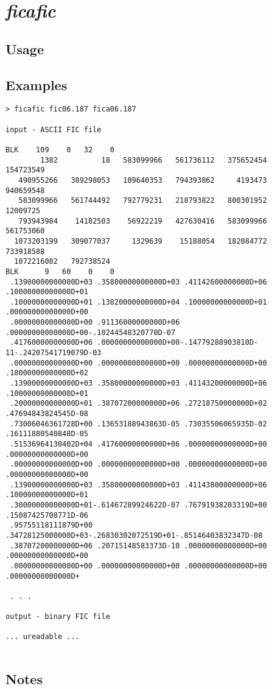 \section{\emph{ficafic}}
\subsection{Usage}
\subsection{Examples}

\begin{small}
\begin{Verbatim}
> ficafic fic06.187 fica06.187

input - ASCII FIC file

BLK    109    0   32    0
        1382          18   583099966   561736112   375652454   154723549
   490955266   389298053   109640353   794393862     4193473   940659548
   583099966   561744492   792779231   218793822   800301952    12009725
   793943984    14182503    56922219   427630416   583099966   561753060
  1073203199   309077037     1329639    15188054   182084772   733918588
  1072216082   792738524
BLK      9   60    0    0
 .13900000000000D+03 .35800000000000D+03 .41142600000000D+06 .10000000000000D+01
 .10000000000000D+01 .13820000000000D+04 .10000000000000D+01 .00000000000000D+00
 .00000000000000D+00 .91136000000000D+06 .00000000000000D+00-.10244548320770D-07
 .41760000000000D+06 .00000000000000D+00-.14779288903810D-11-.24207541719079D-03
 .00000000000000D+00 .00000000000000D+00 .00000000000000D+00 .18000000000000D+02
 .13900000000000D+03 .35800000000000D+03 .41143200000000D+06 .10000000000000D+01
 .20000000000000D+01 .38707200000000D+06 .27218750000000D+02 .47694843824545D-08
 .73006046361728D+00 .13653188943863D-05 .73035506065935D-02 .16111880540848D-05
 .51536964130402D+04 .41760000000000D+06 .00000000000000D+00 .00000000000000D+00
 .00000000000000D+00 .00000000000000D+00 .00000000000000D+00 .00000000000000D+00
 .13900000000000D+03 .35800000000000D+03 .41143800000000D+06 .10000000000000D+01
 .30000000000000D+01-.61467289924622D-07 .76791938203319D+00 .15087425708771D-06
 .95755118111879D+00 .34728125000000D+03-.26830302072519D+01-.85146403832347D-08
 .38707200000000D+06 .20715148583373D-10 .00000000000000D+00 .00000000000000D+00
 .00000000000000D+00 .00000000000000D+00 .00000000000000D+00 .00000000000000D+

 . . .

output - binary FIC file

... ureadable ...


\end{Verbatim}
\end{small}
\subsection{Notes}
